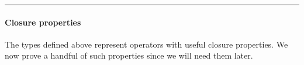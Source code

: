 \begin{center}\rule{0.5\linewidth}{\linethickness}\end{center}

\paragraph{Closure properties}\label{closure-properties}

The types defined above represent operators with useful closure
properties. We now prove a handful of such properties since we will need
them later.

\begin{code}%
\>[0]\<%
\\
\>[0]\<%
\\
\>[0]\AgdaSpace{}%
\AgdaSymbol{:}\AgdaSpace{}%
\AgdaSymbol{\{}\AgdaSpace{}%
\AgdaSymbol{:}\AgdaSpace{}%
\AgdaSymbol{\}\{}\AgdaSpace{}%
\AgdaSymbol{:}\AgdaSpace{}%
\AgdaSpace{}%
\AgdaSymbol{(}\AgdaSpace{}%
\AgdaSpace{}%
\AgdaSymbol{)(}\AgdaSpace{}%
\AgdaSymbol{)\}}\<%
\\
\>[0][@{}l@{\AgdaIndent{0}}]%
\>[1]%
\>[9]\AgdaSpace{}%
\AgdaSpace{}%
\AgdaSymbol{\{}\AgdaSymbol{\}\{}\AgdaSymbol{\}}\AgdaSpace{}%
\<%
\\
\>[0]\AgdaSymbol{\{}\AgdaSymbol{\}\{}\AgdaSymbol{\}}\AgdaSpace{}%
\AgdaSymbol{\{}\AgdaSymbol{\}}\AgdaSpace{}%
\AgdaSpace{}%
\AgdaSymbol{=}\AgdaSpace{}%
\AgdaSymbol{\{}\AgdaSpace{}%
\AgdaSymbol{=}\AgdaSpace{}%
\AgdaSymbol{(}\AgdaSpace{}%
\AgdaSpace{}%
\AgdaSymbol{)\}\{}\AgdaSpace{}%
\AgdaSymbol{=}\AgdaSpace{}%
\AgdaSymbol{\}}\AgdaSpace{}%
\AgdaSymbol{(}\AgdaSpace{}%
\AgdaSymbol{)}\AgdaSpace{}%
\AgdaSymbol{(}\AgdaSpace{}%
\AgdaSymbol{)}\<%
\\
%
\\[\AgdaEmptyExtraSkip]%
\>[0]\<%
\\
\>[0]\AgdaSpace{}%

\end{code}
